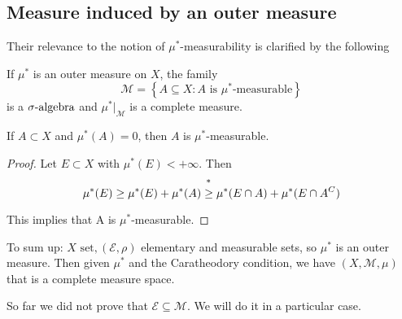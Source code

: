 \subsection{Measure induced by an outer measure}
Their relevance to the notion of \(\mu^*\)-measurability is clarified by the following
\begin{theorem}[Caratheodory]
    If \(\mu^*\) is an outer measure on \(X\), the family
    \[
        \mathcal{M} = \left\lbrace A \subseteq X : A \mbox{ is }\mu^*\mbox{-measurable}\right\rbrace
    \]
    is a \(\sigma\mbox{-algebra}\) and \(\mu^*\vert_{\mathcal{M}}\) is a complete measure.
\end{theorem}
\begin{lemma}
    If \(A \subset X\) and \(\mu^*(A) = 0\), then \(A\) is \(\mu^*\)-measurable.
\end{lemma}
\begin{proof}
    Let \(E \subset X\) with \(\mu^*(E) < +\infty\). Then 
    \[
        \mu^*(E) \geq \mu^*(E) + \mu^*(A) \overset{\symbolfootnotemark[1]{\(E \cap A^C \subseteq E\) and \(E\cap A \subseteq A\) + monotonicity}}{\geq}  \mu^*(E \cap A) + \mu^*(E \cap A^C)
    \]
    
    This implies that A is \(\mu^*\)-measurable.
\end{proof}
To sum up: \(X \mbox{ set}, (\mathcal{E}, \rho)\) elementary and measurable sets, so \(\mu^*\) is an outer measure. Then given \(\mu^*\) and the Caratheodory condition, we have \((X, \mathcal{M}, \mu)\) that is a complete measure space.
\begin{remark}
    So far we did not prove that \(\mathcal{E} \subseteq \mathcal{M}\). We will do it in a particular case.
\end{remark}
